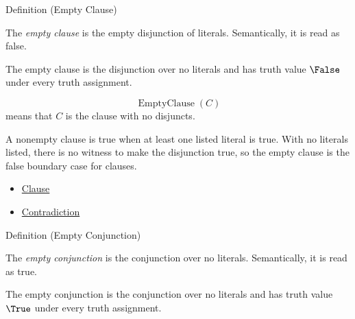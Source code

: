 \begin{definitionbox}{Definition (Empty Clause)}
\begin{definition}
\label{def:empty-clause-propositional-logic}
The \emph{empty clause} is the empty disjunction of literals. Semantically, it
is read as false.
\end{definition}
\end{definitionbox}

\begin{remark*}
The empty clause is the disjunction over no literals and has truth value
\(\False\) under every truth assignment.
\end{remark*}

\begin{remark*}
\[
\operatorname{EmptyClause}(C)
\]
means that \(C\) is the clause with no disjuncts.
\end{remark*}

\begin{remark*}[Interpretation]
A nonempty clause is true when at least one listed literal is true. With no
literals listed, there is no witness to make the disjunction true, so the empty
clause is the false boundary case for clauses.
\end{remark*}

\begin{dependencies}
\begin{itemize}
  \item \hyperref[def:clause-propositional-logic]{Clause}
  \item \hyperref[def:contradiction-propositional-logic]{Contradiction}
\end{itemize}
\end{dependencies}

\begin{definitionbox}{Definition (Empty Conjunction)}
\begin{definition}
\label{def:empty-conjunction-propositional-logic}
The \emph{empty conjunction} is the conjunction over no literals. Semantically,
it is read as true.
\end{definition}
\end{definitionbox}

\begin{remark*}
The empty conjunction is the conjunction over no literals and has truth value
\(\True\) under every truth assignment.
\end{remark*}

